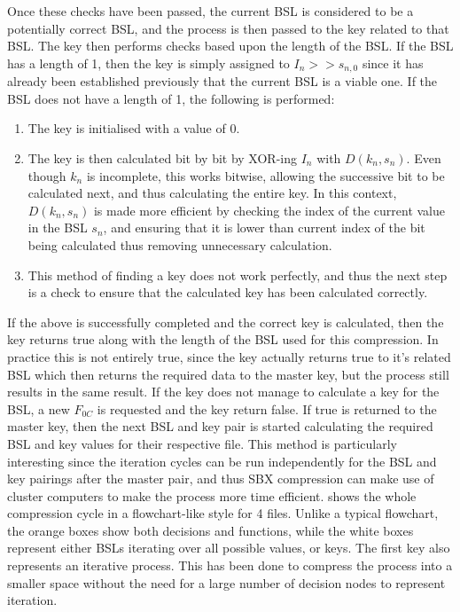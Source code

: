 \documentclass[10pt]{article}
\begin{document}
Once these checks have been passed, the current BSL is considered to be a potentially correct BSL, and the process is then passed to the key related to that BSL. The key then performs checks based upon the length of the BSL. If the BSL has a length of 1, then the key is simply assigned to $I_n >> s_{n,0}$ since it has already been established previously that the current BSL is a viable one. If the BSL does not have a length of 1, the following is performed:
\begin{enumerate}
    \item The key is initialised with a value of 0.
    \item The key is then calculated bit by bit by XOR-ing $I_n$ with $D(k_n,s_n)$. Even though $k_n$ is incomplete, this works bitwise, allowing the successive bit to be calculated next, and thus calculating the entire key. In this context, $D(k_n,s_n)$ is made more efficient by checking the index of the current value in the BSL $s_n$, and ensuring that it is lower than current index of the bit being calculated thus removing unnecessary calculation.
    \item This method of finding a key does not work perfectly, and thus the next step is a check to ensure that the calculated key has been calculated correctly.
\end{enumerate}

If the above is successfully completed and the correct key is calculated, then the key returns true along with the length of the BSL used for this compression. In practice this is not entirely true, since the key actually returns true to it's related BSL which then returns the required data to the master key, but the process still results in the same result. If the key does not manage to calculate a key for the BSL, a  new $F_{0C}$ is requested and the key return false. If true is returned to the master key, then the next BSL and key pair is started calculating the required BSL and key values for their respective file. This method is particularly interesting since the iteration cycles can be run independently for the BSL and key pairings after the master pair, and thus SBX compression can make use of cluster computers to make the process more time efficient.  shows the whole compression cycle in a flowchart-like style for 4 files. Unlike a typical flowchart, the orange boxes show both decisions and functions, while the white boxes represent either BSLs iterating over all possible values, or keys. The first key also represents an iterative process. This has been done to compress the process into a smaller space without the need for a large number of decision nodes to represent iteration.
\end{document}
